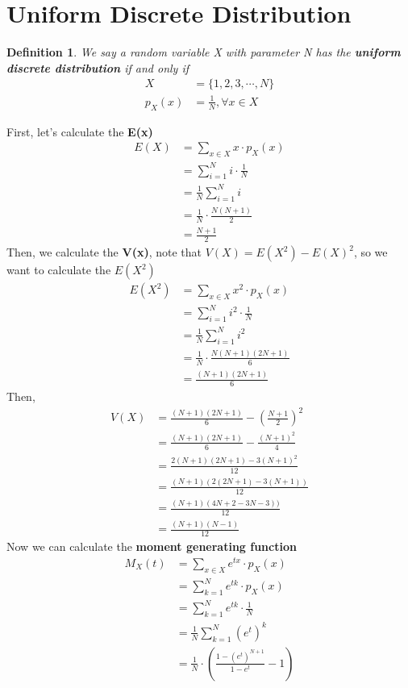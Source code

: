 \documentclass[11pt,oneside]{book}
\theoremstyle{break}
\theoremstyle{break}
\newtheorem{defn}{Definition}[corL]
\begin{document}
\section[Uniform Discrete Distribution]{Uniform Discrete Distribution}
\begin{defn}We say a random variable X with parameter N has the \textbf{uniform discrete distribution} if and only if \begin{align*}
X&=\{1,2,3,\cdots,N\}\\
p_X(x)&=\frac{1}{N},\forall x\in X
\end{align*} 
\end{defn}
First, let's calculate the \textbf{E(x)}\begin{align*}
E(X)&=\sum_{x\in X}x\cdot p_X(x)\\
&=\sum_{i=1}^{N}i\cdot \frac{1}{N}\\
&=\frac{1}{N}\sum_{i=1}^{N}i\\
&=\frac{1}{N}\cdot \frac{N(N+1)}{2}\\
&=\frac{N+1}{2}
\end{align*}
Then, we calculate the \textbf{V(x)}, note that $V(X)=E(X^2)-E(X)^2$, so we want to calculate the $E(X^2)$\begin{align*}
E(X^2)&=\sum_{x\in X}x^2\cdot p_X(x)\\
&=\sum_{i=1}^{N}i^2\cdot \frac{1}{N}\\
&=\frac{1}{N}\sum_{i=1}^{N}i^2\\
&=\frac{1}{N}\cdot \frac{N(N+1)(2N+1)}{6}\\
&=\frac{(N+1)(2N+1)}{6}
\end{align*}
Then,\begin{align*}
V(X)&=\frac{(N+1)(2N+1)}{6}-\left( \frac{N+1}{2}\right)^2\\
&=\frac{(N+1)(2N+1)}{6}-\frac{\left( N+1\right)^2}{4}\\
&=\frac{2(N+1)(2N+1)-3(N+1)^2}{12}\\
&=\frac{(N+1)(2(2N+1)-3(N+1)) }{12}\\
&=\frac{(N+1)(4N+2-3N-3)) }{12}\\
&=\frac{(N+1)(N-1)}{12}
\end{align*}
Now we can calculate the \textbf{moment generating function} \begin{align*}
M_X(t)&=\sum_{x\in X}e^{tx}\cdot p_X(x)\\
&=\sum_{k=1}^{N}e^{tk}\cdot p_X(x)\\
&=\sum_{k=1}^{N}e^{tk}\cdot \frac{1}{N}\\
&=\frac{1}{N} \sum_{k=1}^{N}(e^{t})^k\\
&=\frac{1}{N}\cdot \left( \frac{1-(e^t)^{N+1}}{1-e^t} -1 \right)
\end{align*}
\end{document}
